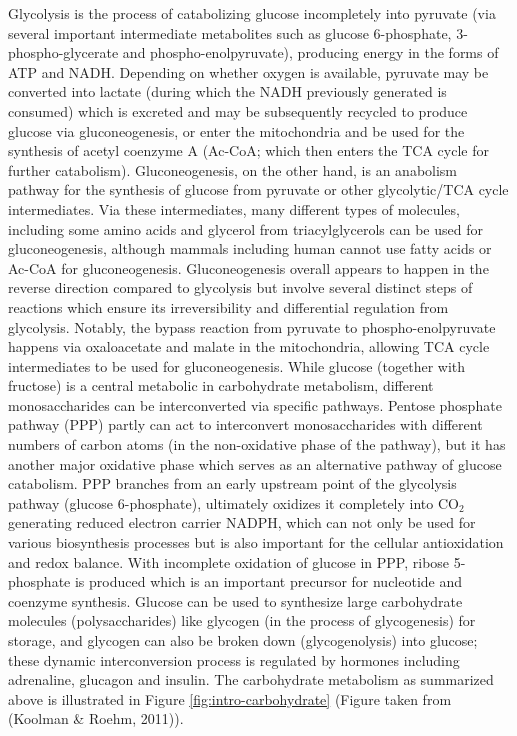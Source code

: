 \documentclass[12pt,twoside,openany,\mydriver]{thesis}  %
\begin{document}
Glycolysis is the process of catabolizing glucose incompletely into pyruvate (via several important intermediate metabolites such as glucose 6-phosphate, 3-phospho-glycerate and phospho-enolpyruvate), producing energy in the forms of ATP and NADH. Depending on whether oxygen is available, pyruvate may be converted into lactate (during which the NADH previously generated is consumed) which is excreted and may be subsequently recycled to produce glucose via gluconeogenesis, or enter the mitochondria and be used for the synthesis of acetyl coenzyme A (Ac-CoA; which then enters the TCA cycle for further catabolism). Gluconeogenesis, on the other hand, is an anabolism pathway for the synthesis of glucose from pyruvate or other glycolytic/TCA cycle intermediates. Via these intermediates, many different types of molecules, including some amino acids and glycerol from triacylglycerols can be used for gluconeogenesis, although mammals including human cannot use fatty acids or Ac-CoA for gluconeogenesis. Gluconeogenesis overall appears to happen in the reverse direction compared to glycolysis but involve several distinct steps of reactions which ensure its irreversibility and differential regulation from glycolysis. Notably, the bypass reaction from pyruvate to phospho-enolpyruvate happens via oxaloacetate and malate in the mitochondria, allowing TCA cycle intermediates to be used for gluconeogenesis. While glucose (together with fructose) is a central metabolic in carbohydrate metabolism, different monosaccharides can be interconverted via specific pathways. Pentose phosphate pathway (PPP) partly can act to interconvert monosaccharides with different numbers of carbon atoms (in the non-oxidative phase of the pathway), but it has another major oxidative phase which serves as an alternative pathway of glucose catabolism. PPP branches from an early upstream point of the glycolysis pathway (glucose 6-phosphate), ultimately oxidizes it completely into \(\mathrm{CO_2}\) generating reduced electron carrier NADPH, which can not only be used for various biosynthesis processes but is also important for the cellular antioxidation and redox balance. With incomplete oxidation of glucose in PPP, ribose 5-phosphate is produced which is an important precursor for nucleotide and coenzyme synthesis. Glucose can be used to synthesize large carbohydrate molecules (polysaccharides) like glycogen (in the process of glycogenesis) for storage, and glycogen can also be broken down (glycogenolysis) into glucose; these dynamic interconversion process is regulated by hormones including adrenaline, glucagon and insulin. The carbohydrate metabolism as summarized above is illustrated in Figure \ref{fig:intro-carbohydrate} (Figure taken from (Koolman \& Roehm, 2011)).
\end{document}
